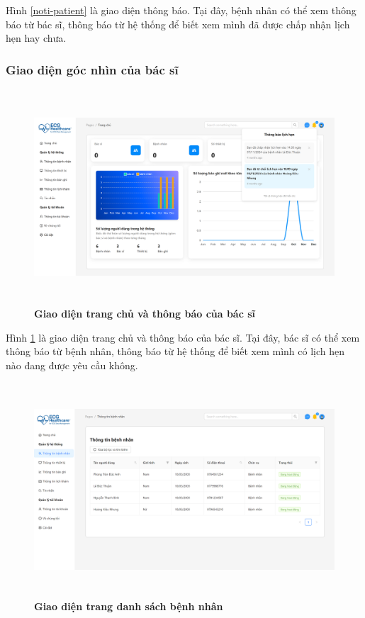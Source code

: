 Hình \ref{noti-patient} là giao diện thông báo. Tại đây, bệnh nhân có thể xem thông báo từ bác sĩ, thông báo từ hệ thống để biết xem mình đã được chấp nhận lịch hẹn hay chưa.

\subsubsection{Giao diện góc nhìn của bác sĩ}
\begin{figure}[H]
	\centering
	\includegraphics[width=15cm,height=8cm]{Images/doctor_ui/home.png}
	\caption[Giao diện trang chủ và thông báo của bác sĩ]{\bfseries \fontsize{12pt}{0pt}\selectfont Giao diện trang chủ và thông báo của bác sĩ}
	\label{home-doctor}
\end{figure}

Hình \ref{home-doctor} là giao diện trang chủ và thông báo của bác sĩ. Tại đây, bác sĩ có thể xem thông báo từ bệnh nhân, thông báo từ hệ thống để biết xem mình có lịch hẹn nào đang được yêu cầu không.

\begin{figure}[H]
	\centering
	\includegraphics[width=15cm,height=8cm]{Images/doctor_ui/patient-list.png}
	\caption[Giao diện trang danh sách bệnh nhân]{\bfseries \fontsize{12pt}{0pt}\selectfont Giao diện trang danh sách bệnh nhân}
	\label{patient-list}
\end{figure}

